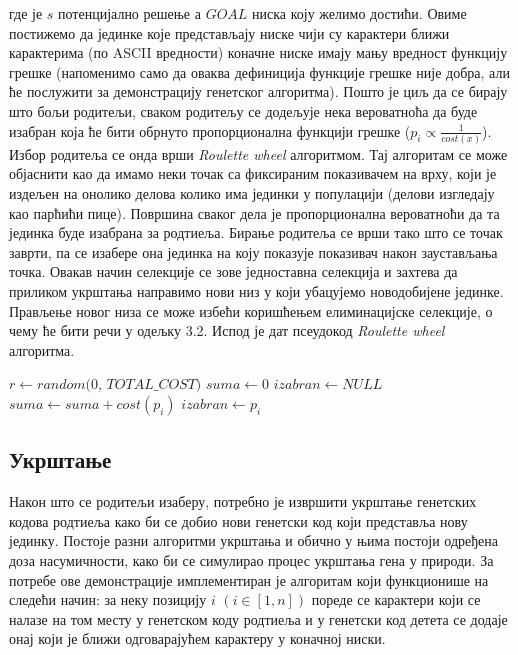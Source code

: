 \documentclass{article}
\begin{document}
где је $s$ потенцијално решење а $GOAL$ ниска коју желимо достићи. Овиме постижемо да 
јединке које представљају ниске чији су карактери ближи карактерима (по ASCII вредности) коначне ниске имају 
мању вредност функцију грешке (напоменимо само да оваква дефиниција функције грешке није 
добра, али ће послужити за демонстрацију генетског алгоритма). Пошто
је циљ да се бирају што бољи родитељи, сваком родитељу се додељује нека вероватноћа да буде изабран
која ће бити обрнуто пропорционална функцији грешке ($p_i \propto \frac{1}{cost(x)}$).
Избор родитеља се онда врши \textit{Roulette wheel} алгоритмом. Тај алгоритам се може објаснити као
да имамо неки точак са фиксираним показивачем на врху, који је издељен на онолико делова колико има јединки у популацији
(делови изгледају као парћићи пице). Површина сваког дела је пропорционална вероватноћи да 
та јединка буде изабрана за родтиеља. Бирање родитеља се врши тако што се точак заврти, па 
се изабере она јединка на коју показује показивач након заустављања точка. Овакав начин селекције
се зове једноставна селекција и захтева да приликом укрштања направимо нови низ у који убацујемо
новодобијене јединке. Прављење новог низа се може избећи коришћењем елиминацијске селекције, о чему ће бити
речи у одељку 3.2. Испод је дат псеудокод \textit{Roulette wheel} алгоритма.

\begin{algorithmic}
\State $r \gets random(0$, $TOTAL\_COST)$
\State $suma \gets 0$
\State $izabran \gets NULL$
    \State $suma \gets suma + cost(p_i)$
        \State $izabran \gets p_i$
    \EndIf
\EndFor
\end{algorithmic}


\subsection{Укрштање}
Након што се родитељи изаберу, потребно је извршити укрштање генетских кодова родтиеља
како би се добио нови генетски код који представља нову јединку. Постоје разни алгоритми укрштања
и обично у њима постоји одређена доза насумичности, како би се симулирао процес укрштања гена у природи.
За потребе ове демонстрације имплементиран је алгоритам који функционише на следећи начин: 
за неку позицију $i$ $(i \in [1, n])$ пореде се карактери који се налазе на том месту у генетском коду родтиеља
и у генетски код детета се додаје онај који је ближи одговарајућем карактеру у коначној ниски. 
\end{document}
